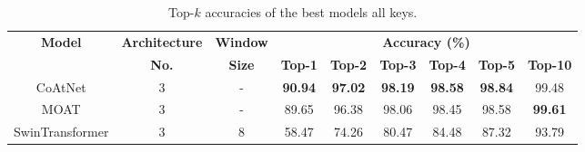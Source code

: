 \documentclass[a4paper,11pt,twoside]{report}
\theoremstyle{definition}
\begin{document}
\begin{table}[h!]
\centering
\caption{Top-$k$ accuracies of the best models all keys.}
\begin{adjustbox}{max width=\textwidth}
\begin{tabular}{c|c|c|cccccc}
\hline
\textbf{Model} & \textbf{Architecture} & \textbf{Window} & \multicolumn{6}{c}{\textbf{Accuracy (\%)}} \\
\cline{4-9}
 & \textbf{No.} & \textbf{Size} & \textbf{Top-1} & \textbf{Top-2} & \textbf{Top-3} & \textbf{Top-4} & \textbf{Top-5} & \textbf{Top-10} \\
\hline
CoAtNet & 3 & - & \textbf{90.94} & \textbf{97.02} & \textbf{98.19} & \textbf{98.58} & \textbf{98.84} & 99.48 \\
MOAT & 3 & - & 89.65 & 96.38 & 98.06 & 98.45 & 98.58 & \textbf{99.61} \\
SwinTransformer & 3 & 8 & 58.47 & 74.26 & 80.47 & 84.48 & 87.32 & 93.79 \\
\hline
\end{tabular}
\end{adjustbox}
\label{tab:all_keys_top_k_accuracies}
\end{table}
\end{document}
